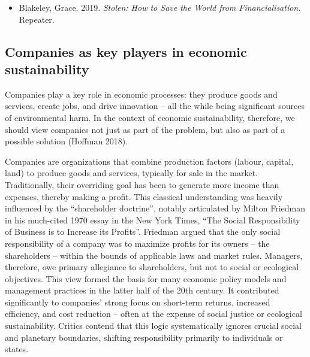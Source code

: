 \documentclass[
  a4paper,
  DIV=11,
  numbers=noendperiod,
  oneside,
  openany]{scrreprt}
\providecommand{\tightlist}{%
  \setlength{\itemsep}{0pt}\setlength{\parskip}{0pt}}
\begin{document}
\begin{tcolorbox}[enhanced jigsaw, arc=.35mm, bottomrule=.15mm, bottomtitle=1mm, breakable, colback=white, colbacktitle=quarto-callout-caution-color!10!white, colframe=quarto-callout-caution-color-frame, coltitle=black, left=2mm, leftrule=.75mm, opacityback=0, opacitybacktitle=0.6, rightrule=.15mm, title={Further reading}, titlerule=0mm, toprule=.15mm, toptitle=1mm]

\begin{itemize}
\tightlist
\item
  Blakeley, Grace. 2019. \emph{Stolen: How to Save the World from
  Financialisation}. Repeater.
\end{itemize}

\end{tcolorbox}

\subsection{Companies as key players in economic
sustainability}\label{companies-as-key-players-in-economic-sustainability}

Companies play a key role in economic processes: they produce goods and
services, create jobs, and drive innovation -- all the while being
significant sources of environmental harm. In the context of economic
sustainability, therefore, we should view companies not just as part of
the problem, but also as part of a possible solution (Hoffman 2018).

Companies are organizations that combine production factors (labour,
capital, land) to produce goods and services, typically for sale in the
market. Traditionally, their overriding goal has been to generate more
income than expenses, thereby making a profit. This classical
understanding was heavily influenced by the ``shareholder doctrine'',
notably articulated by Milton Friedman in his much-cited 1970 essay in
the New York Times, ``The Social Responsibility of Business is to
Increase its Profits''. Friedman argued that the only social
responsibility of a company was to maximize profits for its owners --
the shareholders -- within the bounds of applicable laws and market
rules. Managers, therefore, owe primary allegiance to shareholders, but
not to social or ecological objectives. This view formed the basis for
many economic policy models and management practices in the latter half
of the 20th century. It contributed significantly to companies' strong
focus on short-term returns, increased efficiency, and cost reduction --
often at the expense of social justice or ecological sustainability.
Critics contend that this logic systematically ignores crucial social
and planetary boundaries, shifting responsibility primarily to
individuals or states.
\end{document}
